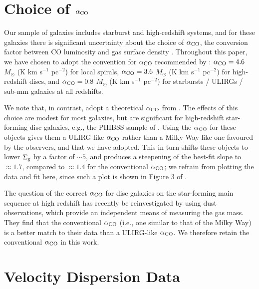 \documentclass[useAMS,usenatbib]{mn2e}
\begin{document}
\begin{appendix}

\section{Choice of $\alpha_{\rm CO}$}
\label{app:alpha_CO}

Our sample of galaxies includes starburst and high-redshift systems, and for these galaxies there is significant uncertainty about the choice of $\alpha_{\rm CO}$, the conversion factor between CO luminosity and gas surface density \citep{bolatto13a}. Throughout this paper, we have chosen to adopt the convention for $\alpha_{\rm CO}$ recommended by \citet{daddi10a}: $\alpha_{\rm CO} = 4.6$ $M_\odot$ (K km s$^{-1}$ pc$^{-2}$) for local spirals, $\alpha_{\rm CO} = 3.6$ $M_\odot$ (K km s$^{-1}$ pc$^{-2}$) for high-redshift discs, and $\alpha_{\rm CO} = 0.8$ $M_\odot$ (K km s$^{-1}$ pc$^{-2}$) for starbursts / ULIRGs / sub-mm galaxies at all redshifts.

We note that, in contrast, \citet{faucher-giguere13a} adopt a theoretical $\alpha_{\rm CO}$ from \citet{narayanan12a}. The effects of this choice are modest for most galaxies, but are significant for high-redshift star-forming disc galaxies, e.g., the PHIBSS sample of \citet{tacconi13a}. Using the \citet{narayanan12a} $\alpha_{\rm CO}$ for these objects gives them a ULIRG-like $\alpha_{\rm CO}$ rather than a Milky Way-like one favoured by the observers, and that we have adopted. This in turn shifts these objects to lower $\Sigma_{\rm g}$ by a factor of $\sim 5$, and produces a steepening of the best-fit slope to $\approx 1.7$, compared to $\approx 1.4$ for the conventional $\alpha_{\rm CO}$; we refrain from plotting the data and fit here, since such a plot is shown in Figure 3 of \citet{thompson16a}.

The question of the correct $\alpha_{\rm CO}$ for disc galaxies on the star-forming main sequence at high redshift has recently be reinvestigated by \citet{genzel15a} using dust observations, which provide an independent means of measuring the gas mass. They find that the conventional $\alpha_{\rm CO}$ (i.e., one similar to that of the Milky Way) is a better match to their data than a ULIRG-like $\alpha_{\rm CO}$. We therefore retain the conventional $\alpha_{\rm CO}$ in this work.



\section{Velocity Dispersion Data}
\label{app:sigma_sfr_data}


\end{appendix}
\end{document}
